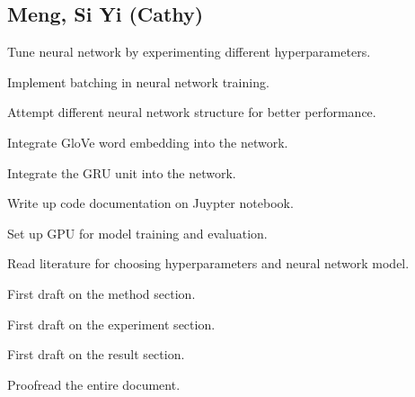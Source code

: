 \begin{appendices}
\section{Meng, Si Yi (Cathy) }
\begin{compactitem}
\item Tune neural network by experimenting different hyperparameters.
\item Implement batching in neural network training.
\item Attempt different neural network structure for better performance.
\item Integrate GloVe word embedding into the network.
\item Integrate the GRU unit into the network.
\item Write up code documentation on Juypter notebook.
\item Set up GPU for model training and evaluation.
\item Read literature for choosing hyperparameters and neural network model.
\item First draft on the method section.
\item First draft on the experiment section.
\item First draft on the result section.
\item Proofread the entire document.
\end{compactitem}
\end{appendices}